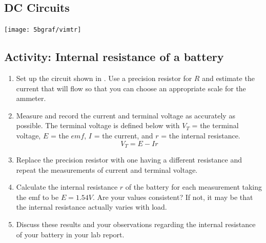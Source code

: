\begin{multicols}{2}
\section {DC Circuits}


\begin{center}
	\texttt{[image: 5bgraf/vimtr]} %
	\label{f:vimtr}
\end{center}

\subsection{Activity: Internal resistance of a battery}
\begin{enumerate}
	 \item Set up the circuit shown in .  Use a precision resistor for $R$ and estimate the current that will flow so that you can choose an appropriate scale for the ammeter.
	\item Measure and record the current and terminal voltage as accurately as possible. The terminal voltage is defined below with $V_T$ = the terminal voltage, $E$ = the $emf$, $I$ = the current, and $r$ = the internal resistance.
\begin{equation} \label{e:vterm}
	V_T  =  E -Ir 	%
\end{equation}
	\item Replace the precision resistor with one having a different resistance and repeat the measurements of current and terminal voltage.
	\item Calculate the internal resistance $r$ of the battery for each measurement taking the emf to be $E = 1.54 V$.  Are your values consistent?  If not, it may be that the internal resistance actually varies with load.
	\item Discuss these results and your observations regarding the internal resistance of your battery in your lab report.
\end{enumerate}



\end{multicols}
